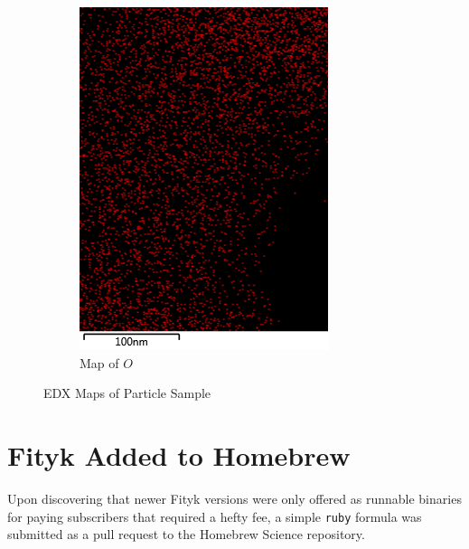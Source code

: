 \documentclass[12pt,a4paper]{article}
\begin{document}
\begin{figure}[htbp]
\begin{subfigure}[b]{0.35\textwidth}
    \includegraphics[width=\textwidth]{Data/O Map.png}
    \caption{Map of $O$}
    \label{fig:o_map}
  \end{subfigure}
  \caption{EDX Maps of Particle Sample}\label{fig:map_grid}
\end{figure}



\section{Fityk Added to Homebrew} %
\label{sec:fityk_homebrew}

Upon discovering that newer Fityk versions were only offered as runnable binaries for paying subscribers that required a hefty fee, a simple \texttt{ruby} formula was submitted as a pull request to the Homebrew Science repository\cite{hbs}.  
\end{document}
